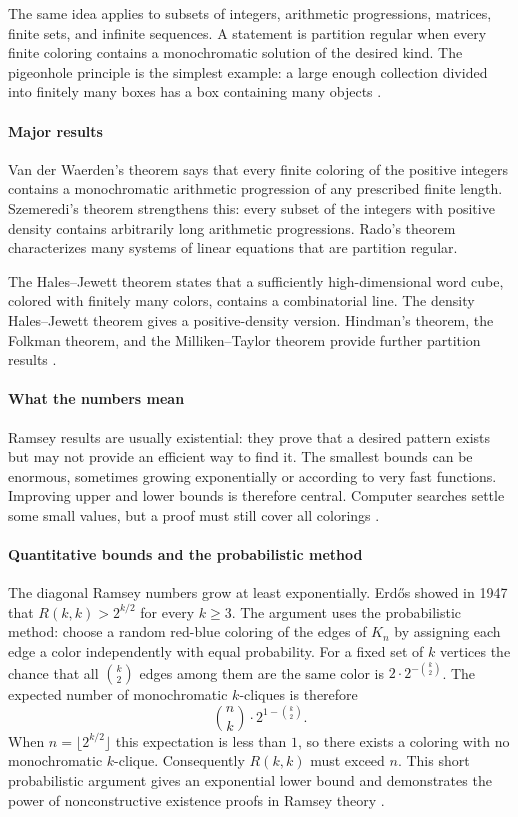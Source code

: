 The same idea applies to subsets of integers, arithmetic progressions, matrices, finite sets, and infinite sequences. A statement is partition regular when every finite coloring contains a monochromatic solution of the desired kind. The pigeonhole principle is the simplest example: a large enough collection divided into finitely many boxes has a box containing many objects \cite{ramsey_ref1}.

\paragraph{Major results}
Van der Waerden's theorem says that every finite coloring of the positive integers contains a monochromatic arithmetic progression of any prescribed finite length. Szemeredi's theorem strengthens this: every subset of the integers with positive density contains arbitrarily long arithmetic progressions. Rado's theorem characterizes many systems of linear equations that are partition regular.

The Hales--Jewett theorem states that a sufficiently high-dimensional word cube, colored with finitely many colors, contains a combinatorial line. The density Hales--Jewett theorem gives a positive-density version. Hindman's theorem, the Folkman theorem, and the Milliken--Taylor theorem provide further partition results \cite{ramsey_ref3}.

\paragraph{What the numbers mean}
Ramsey results are usually existential: they prove that a desired pattern exists but may not provide an efficient way to find it. The smallest bounds can be enormous, sometimes growing exponentially or according to very fast functions. Improving upper and lower bounds is therefore central. Computer searches settle some small values, but a proof must still cover all colorings \cite{ramsey_ref2}.

\paragraph{Quantitative bounds and the probabilistic method}
The diagonal Ramsey numbers grow at least exponentially. Erdős showed in 1947 that $R(k,k)>2^{k/2}$ for every $k\geq3$. The argument uses the probabilistic method: choose a random red-blue coloring of the edges of $K_n$ by assigning each edge a color independently with equal probability. For a fixed set of $k$ vertices the chance that all $\binom{k}{2}$ edges among them are the same color is $2\cdot2^{-\binom{k}{2}}$. The expected number of monochromatic $k$-cliques is therefore
\[
\binom{n}{k}\cdot2^{1-\binom{k}{2}}.
\]
When $n=\lfloor2^{k/2}\rfloor$ this expectation is less than $1$, so there exists a coloring with no monochromatic $k$-clique. Consequently $R(k,k)$ must exceed $n$. This short probabilistic argument gives an exponential lower bound and demonstrates the power of nonconstructive existence proofs in Ramsey theory \cite{ramsey_ref1,ramsey_ref2}.

